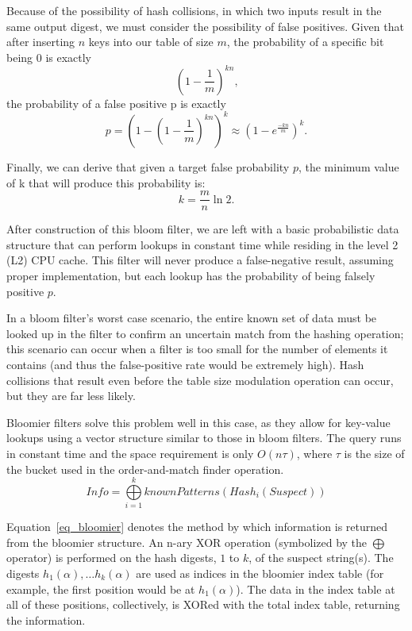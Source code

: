 \documentclass[12pt,journal]{IEEEtran}
\begin{document}
Because of the possibility of hash collisions, in which two inputs result in the same output digest, we must consider the possibility of false positives. Given that after inserting $n$ keys into our table of size $m$, the probability of a specific bit being 0 is exactly
\begin{equation}
(1 - \frac{1}{m})^{kn} \text{,}
\end{equation}
 the probability of a false positive p is exactly
\begin{equation}
p = (1 - (1 - \frac{1}{m})^{kn})^k \approx (1 - e^{\frac{-kn}{m}})^k \text{.}
\end{equation}

Finally, we can derive that given a target false probability $p$, the minimum value of k that will produce this probability is:
\begin{equation}
k = \frac{m}{n}\ln{2}\text{.}
\end{equation}

After construction of this bloom filter, we are left with a basic probabilistic data structure that can perform lookups in constant time while residing in the level 2 (L2) CPU cache. This filter will never produce a false-negative result, assuming proper implementation, but each lookup has the probability of being falsely positive $p$.\par

In a bloom filter's worst case scenario, the entire known set of data must be looked up in the filter to confirm an uncertain match from the hashing operation; this scenario can occur when a filter is too small for the number of elements it contains (and thus the false-positive rate would be extremely high). Hash collisions that result even before the table size modulation operation can occur, but they are far less likely.\par

Bloomier filters\cite{Chazelle2004} solve this problem well in this case, as they allow for key-value lookups using a vector structure similar to those in bloom filters. The query runs in constant time and the space requirement is only $O(n\tau)$, where $\tau$ is the size of the bucket used in the order-and-match finder operation\cite{Duy,charles2008bloomier}.
\begin{equation}
Info = \bigoplus\limits_{i=1}^k knownPatterns(Hash_i(Suspect))
\label{eq_bloomier}
\end{equation}

Equation~\ref{eq_bloomier} denotes the method by which information is returned from the bloomier structure. An n-ary XOR operation (symbolized by the $\bigoplus$ operator) is performed on the hash digests, $1$ to $k$, of the suspect string(s). The digests $h_1(\alpha), \dots h_k(\alpha)$ are used as indices in the bloomier index table (for example, the first position would be at $h_1(\alpha)$). The data in the index table at all of these positions, collectively, is XORed with the total index table, returning the information.\par
\end{document}
